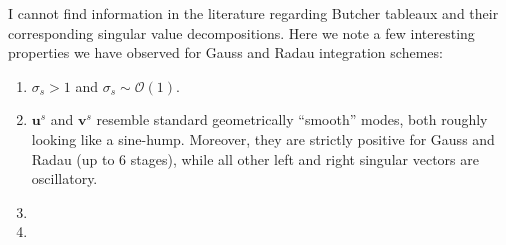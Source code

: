 \documentclass[a4paper,10pt]{article}
\begin{document}
I cannot find information in the literature regarding Butcher tableaux and
their corresponding singular value decompositions. Here we note a few interesting
properties we have observed for Gauss and Radau integration schemes:
%
\begin{enumerate}
	\item $\sigma_s > 1$ and $\sigma_s\sim\mathcal{O}(1)$.
	
	\item $\mathbf{u}^s$ and $\mathbf{v}^s$ resemble standard geometrically
	``smooth'' modes, both roughly looking like a sine-hump. Moreover, they are
	strictly positive for Gauss and Radau (up to 6 stages), while all other left
	and right singular vectors are oscillatory.

	\item 




	\item
\end{enumerate}
\end{document}
